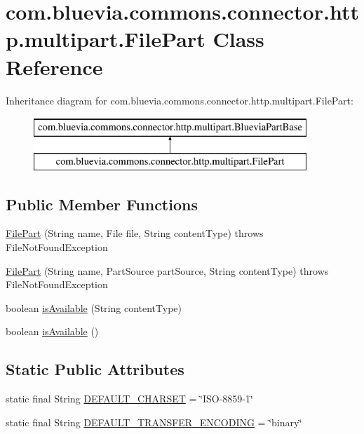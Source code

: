 \hypertarget{classcom_1_1bluevia_1_1commons_1_1connector_1_1http_1_1multipart_1_1FilePart}{
\section{com.bluevia.commons.connector.http.multipart.FilePart Class Reference}
\label{classcom_1_1bluevia_1_1commons_1_1connector_1_1http_1_1multipart_1_1FilePart}
}
Inheritance diagram for com.bluevia.commons.connector.http.multipart.FilePart:\begin{figure}[H]
\begin{center}
\leavevmode
\includegraphics[height=2.000000cm]{classcom_1_1bluevia_1_1commons_1_1connector_1_1http_1_1multipart_1_1FilePart}
\end{center}
\end{figure}
\subsection*{Public Member Functions}
\begin{DoxyCompactItemize}
\item 
\hyperlink{classcom_1_1bluevia_1_1commons_1_1connector_1_1http_1_1multipart_1_1FilePart_a9121a5b9fe8df09d252542c5d7021f51}{FilePart} (String name, File file, String contentType)  throws FileNotFoundException 
\item 
\hyperlink{classcom_1_1bluevia_1_1commons_1_1connector_1_1http_1_1multipart_1_1FilePart_a999aebc53bbf5b78952c9579792035db}{FilePart} (String name, PartSource partSource, String contentType)  throws FileNotFoundException 
\item 
boolean \hyperlink{classcom_1_1bluevia_1_1commons_1_1connector_1_1http_1_1multipart_1_1FilePart_a26da4d2cd7a601b16d138abd05428a75}{isAvailable} (String contentType)
\item 
boolean \hyperlink{classcom_1_1bluevia_1_1commons_1_1connector_1_1http_1_1multipart_1_1FilePart_a3e87723a63417218fccdacb0959b6217}{isAvailable} ()
\end{DoxyCompactItemize}
\subsection*{Static Public Attributes}
\begin{DoxyCompactItemize}
\item 
static final String \hyperlink{classcom_1_1bluevia_1_1commons_1_1connector_1_1http_1_1multipart_1_1FilePart_acb902bd4273c47c862a713f482e00e7e}{DEFAULT\_\-CHARSET} = \char`\"{}ISO-\/8859-\/1\char`\"{}
\item 
static final String \hyperlink{classcom_1_1bluevia_1_1commons_1_1connector_1_1http_1_1multipart_1_1FilePart_a8af46da7bcd44774a2926fcabd1935d5}{DEFAULT\_\-TRANSFER\_\-ENCODING} = \char`\"{}binary\char`\"{}
\end{DoxyCompactItemize}
